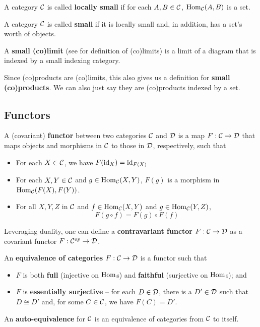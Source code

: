 \documentclass[12pt]{article}
\begin{document}
\begin{defn}
	A category $\mathcal{C}$ is called \textbf{locally small} if for each $A,B\in\mathcal{C}$, $\operatorname{Hom}_{\mathcal{C}}(A,B)$ is a set.
\end{defn}
\begin{defn}
	A category $\mathcal{C}$ is called \textbf{small} if it is locally small and, in addition, has a set's worth of objects.
\end{defn}
\begin{defn}
	A \textbf{small (co)limit} (see \cite{riehl16} for definition of (co)limits) is a limit of a diagram that is indexed by a small indexing category.
\end{defn}
\begin{rmk}
	Since (co)products are (co)limits, this also gives us a definition for \textbf{small (co)products}. We can also just say 
	they are (co)products indexed by a set.
\end{rmk}

\subsection{Functors}
\begin{defn}
  A (covariant) \textbf{functor} between two categories $\mathcal{C}$ and $\mathcal{D}$ is a map $F:\mathcal{C}\to\mathcal{D}$ that maps objects and morphisms in $\mathcal{C}$ to those in $\mathcal{D}$, respectively, such that 
  \begin{itemize}
    \item For each $X\in\mathcal{C}$, we have $F(\operatorname{id}_X)=\operatorname{id}_{F(X)}$
    \item For each $X,Y\in\mathcal{C}$ and $g\in\operatorname{Hom}_{\mathcal{C}}(X,Y)$, $F(g)$ is a morphism in $\operatorname{Hom}_{\mathcal{C}}(F(X),F(Y))$.
    \item For all $X,Y,Z$ in $\mathcal{C}$ and $f\in\operatorname{Hom}_{\mathcal{C}}(X,Y)$ and $g\in\operatorname{Hom}_{\mathcal{C}}(Y,Z)$,
    \[F(g\circ f)=F(g)\circ F(f)\]
  \end{itemize}
\end{defn}
\begin{rmk}
	Leveraging duality, one can define a \textbf{contravariant functor} $F:\mathcal{C}\to \mathcal{D}$ as a covariant functor $F:\mathcal{C}^{op}\to \mathcal{D}$.
\end{rmk}
\begin{defn}
	An \textbf{equivalence of categories} $F:\mathcal{C}\to\mathcal{D}$ is a functor such that 
	\begin{itemize}
		\item $F$ is both \textbf{full} (injective on $\operatorname{Hom}$s) and \textbf{faithful} (surjective on $\operatorname{Hom}$s); and 
		\item $F$ is \textbf{essentially surjective} -- for each $D\in\mathcal{D}$, there is a $D'\in\mathcal{D}$ such that 
		$D\cong D'$ and, for some $C\in\mathcal{C}$, we have $F(C)=D'$.
	\end{itemize}
	An \textbf{auto-equivalence} for $\mathcal{C}$ is an equivalence of categories from $\mathcal{C}$ to itself.
\end{defn}
\end{document}
